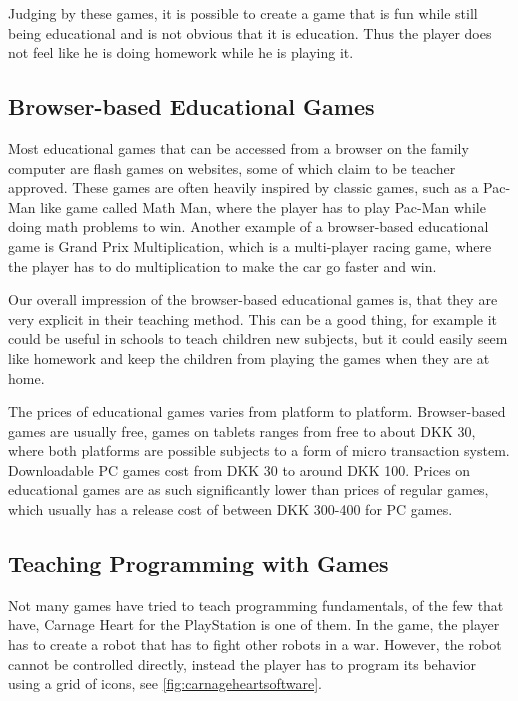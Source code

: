 Judging by these games, it is possible to create a game that is fun while still being educational and is not obvious that it is education. Thus the player does not feel like he is doing homework while he is playing it.

\subsection{Browser-based Educational Games}
Most educational games that can be accessed from a browser on the family computer are flash games on websites, some of which claim to be teacher approved.
These games are often heavily inspired by classic games, such as a Pac-Man like game called Math Man, where the player has to play Pac-Man while doing math problems to win.\cite{mathman} Another example of a browser-based educational game is Grand Prix Multiplication, which is a multi-player racing game, where the player has to do multiplication to make the car go faster and win.\cite{grandprix}\newline

Our overall impression of the browser-based educational games is, that they are very explicit in their teaching method.
This can be a good thing, for example it could be useful in schools to teach children new subjects, but it could easily seem like homework and keep the children from playing the games when they are at home.\newline

The prices of educational games varies from platform to platform. 
Browser-based games are usually free, games on tablets ranges from free to about DKK 30, where both platforms are possible subjects to a form of micro transaction system.
Downloadable PC games cost from DKK 30 to around DKK 100.
Prices on educational games are as such significantly lower than prices of regular games, which usually has a release cost of between DKK 300-400 for PC games.

\subsection{Teaching Programming with Games}
Not many games have tried to teach programming fundamentals, of the few that have, Carnage Heart for the PlayStation is one of them. In the game, the player has to create a robot that has to fight other robots in a war. However, the robot cannot be controlled directly, instead the player has to program its behavior using a grid of icons, see \ref{fig:carnageheartsoftware}.

